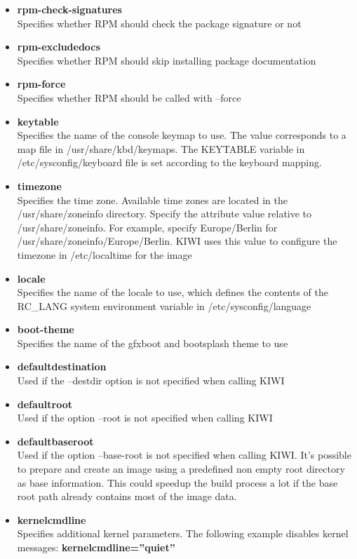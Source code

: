 \begin{itemize}
\item \textbf{rpm-check-signatures}\\
      Specifies whether RPM should check the package signature or not
\item \textbf{rpm-excludedocs}\\
      Specifies whether RPM should skip installing package documentation
\item \textbf{rpm-force}\\
      Specifies whether RPM should be called with --force
\item \textbf{keytable}\\
      Specifies the name of the console keymap to use. The value corresponds
      to a map file in /usr/share/kbd/keymaps. The KEYTABLE variable in
      /etc/sysconfig/keyboard file is set according to the keyboard
      mapping.
\item \textbf{timezone}\\
      Specifies the time zone. Available time zones are located in the
      /usr/share/zoneinfo directory. Specify the attribute value relative to
      /usr/share/zoneinfo. For example, specify Europe/Berlin for
      /usr/share/zoneinfo/Europe/Berlin. KIWI uses this value to configure
      the timezone in /etc/localtime for the image
\item \textbf{locale}\\
      Specifies the name of the locale to use, which defines the
      contents of the RC\_LANG system environment variable in
      /etc/sysconfig/language
\item \textbf{boot-theme}\\
      Specifies the name of the gfxboot and bootsplash theme to use
\item \textbf{defaultdestination}\\
      Used if the --destdir option is not specified when calling KIWI
\item \textbf{defaultroot}\\
      Used if the option --root is not specified when calling KIWI
\item \textbf{defaultbaseroot}\\
      Used if the option --base-root is not specified when
      calling KIWI. It's possible to prepare and create an image using a
      predefined non empty root directory as base information.
      This could speedup the build process a lot if the base root path
      already contains most of the image data.
\item \textbf{kernelcmdline}\\
      Specifies additional kernel parameters. The following example
      disables kernel messages: \textbf{kernelcmdline=''quiet''}
\end{itemize}

